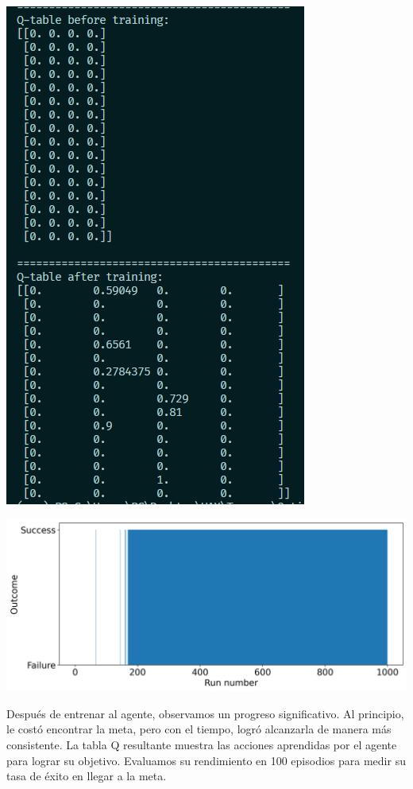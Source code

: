 \documentclass{article}
\begin{document}
\vspace{0.5cm}

\begin{center}
    \includegraphics[width=0.5\linewidth]{aftertraining.png}
\end{center}

\vspace{0.5cm}

\begin{center}
    \includegraphics[width=0.8\linewidth]{Figure_1.png}
\end{center}

\vspace{0.5cm}

Después de entrenar al agente, observamos un progreso significativo. Al principio, le costó encontrar la meta, pero con el tiempo, logró alcanzarla de manera más consistente. La tabla Q resultante muestra las acciones aprendidas por el agente para lograr su objetivo. Evaluamos su rendimiento en 100 episodios para medir su tasa de éxito en llegar a la meta.
\end{document}
